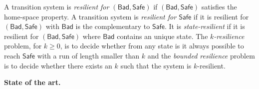 \documentclass[runningheads]{llncs}
\newcommand{\pred}{\textsf{pred}}
\newcommand{\post}{\textsf{post}}
\newcommand{\Bad}{\textsf{Bad}}
\newcommand{\Safe}{\textsf{Safe}}
\begin{document}
A transition system is {\em resilient for $(\Bad,\Safe)$} if $(\Bad,\Safe)$ satisfies the home-space property. A transition system is {\em resilient for $\Safe$} if it is resilient for $(\Bad,\Safe)$ with $\Bad$ is the complementary to $ \Safe$. It is {\em state-resilient} if it is resilient for $(\Bad,\Safe)$ where $\Bad$ contains an unique state.
%
%
%
The {\em $k$-resilience} problem, for $k\geq0$, is to decide whether from any state is it always possible to reach $\Safe$ with a run of length smaller than $k$ 
%
%
 and 
the {\em bounded resilience} problem is to decide whether there exists an $k$ such that the system is $k$-resilient.

\noindent
{\bf State of the art.}
%
\end{document}
